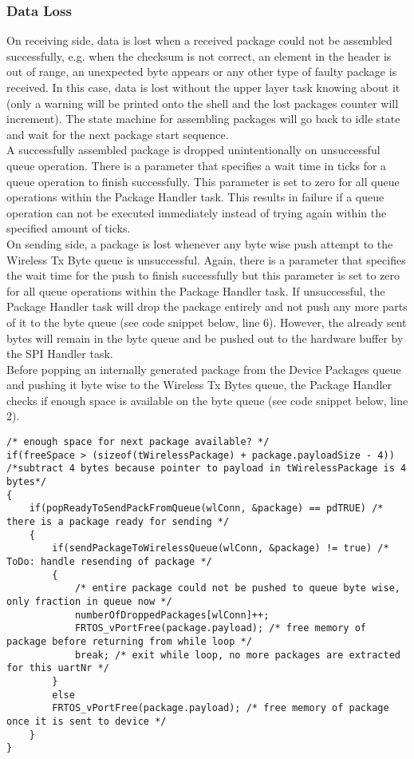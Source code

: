 \subsubsection{Data Loss}
On receiving side, data is lost when a received package could not be assembled successfully, e.g. when the checksum is not correct, an element in the header is out of range, an unexpected byte appears or any other type of faulty package is received. In this case, data is lost without the upper layer task knowing about it (only a warning will be printed onto the shell and the lost packages counter will increment). The state machine for assembling packages will go back to idle state and wait for the next package start sequence.\\
A successfully assembled package is dropped unintentionally on unsuccessful queue operation. There is a parameter that specifies a wait time in ticks for a queue operation to finish successfully. This parameter is set to zero for all queue operations within the Package Handler task. This results in failure if a queue operation can not be executed immediately instead of trying again within the specified amount of ticks.\\
On sending side, a package is lost whenever any byte wise push attempt to the Wireless Tx Byte queue is unsuccessful. Again, there is a parameter that specifies the wait time for the push to finish successfully but this parameter is set to zero for all queue operations within the Package Handler task. If unsuccessful, the Package Handler task will drop the package entirely and not push any more parts of it to the byte queue (see code snippet below, line 6). However, the already sent bytes will remain in the byte queue and be pushed out to the hardware buffer by the SPI Handler task.\\
Before popping an internally generated package from the Device Packages queue and pushing it byte wise to the Wireless Tx Bytes queue, the Package Handler checks if enough space is available on the byte queue (see code snippet below, line 2).
\begin{lstlisting}
/* enough space for next package available? */
if(freeSpace > (sizeof(tWirelessPackage) + package.payloadSize - 4))  /*subtract 4 bytes because pointer to payload in tWirelessPackage is 4 bytes*/
{
    if(popReadyToSendPackFromQueue(wlConn, &package) == pdTRUE) /* there is a package ready for sending */
    {
        if(sendPackageToWirelessQueue(wlConn, &package) != true) /* ToDo: handle resending of package */
        {
            /* entire package could not be pushed to queue byte wise, only fraction in queue now */
            numberOfDroppedPackages[wlConn]++;
            FRTOS_vPortFree(package.payload); /* free memory of package before returning from while loop */
            break; /* exit while loop, no more packages are extracted for this uartNr */
        }
        else
        FRTOS_vPortFree(package.payload); /* free memory of package once it is sent to device */
    }
}
\end{lstlisting}
